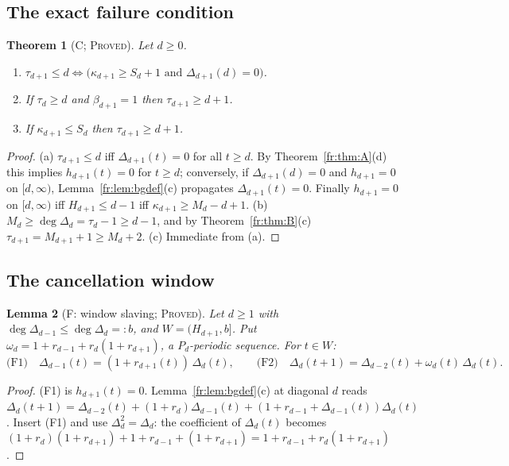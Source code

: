 \documentclass[11pt]{article}
\newtheorem{theorem}{Theorem}[section]
\newtheorem{lemma}[theorem]{Lemma}
\theoremstyle{definition}
\theoremstyle{remark}
\newcommand{\PROVED}{\textsc{Proved}}
\begin{document}
\subsection{The exact failure condition}

\begin{theorem}[C; \PROVED]\label{fr:thm:C}
Let $d\ge0$.
\begin{enumerate}
\item[(a)] $\tau_{d+1}\le d\iff\bigl(\kappa_{d+1}\ge S_d+1\text{ and }\Delta_{d+1}(d)=0\bigr)$.
\item[(b)] If $\tau_d\ge d$ and $\beta_{d+1}=1$ then $\tau_{d+1}\ge d+1$.
\item[(c)] If $\kappa_{d+1}\le S_d$ then $\tau_{d+1}\ge d+1$.
\end{enumerate}
\end{theorem}
\begin{proof}
(a) $\tau_{d+1}\le d$ iff $\Delta_{d+1}(t)=0$ for all $t\ge d$. By Theorem~\ref{fr:thm:A}(d) this implies
$h_{d+1}(t)=0$ for $t\ge d$; conversely, if $\Delta_{d+1}(d)=0$ and $h_{d+1}=0$ on $[d,\infty)$,
Lemma~\ref{fr:lem:bgdef}(c) propagates $\Delta_{d+1}(t)=0$. Finally $h_{d+1}=0$ on $[d,\infty)$ iff
$H_{d+1}\le d-1$ iff $\kappa_{d+1}\ge M_d-d+1$.
(b) $M_d\ge\deg\Delta_d=\tau_d-1\ge d-1$, and by Theorem~\ref{fr:thm:B}(c)
$\tau_{d+1}=M_{d+1}+1\ge M_d+2$.
(c) Immediate from (a).
\end{proof}

\subsection{The cancellation window}

\begin{lemma}[F: window slaving; \PROVED]\label{fr:lem:F}
Let $d\ge1$ with $\deg\Delta_{d-1}\le\deg\Delta_d=:b$, and $W=(H_{d+1},b]$. Put
$\omega_d=1+r_{d-1}+r_d(1+r_{d+1})$, a $P_d$-periodic sequence. For $t\in W$:
\[
\text{(F1)}\quad \Delta_{d-1}(t)=(1+r_{d+1}(t))\,\Delta_d(t),\qquad
\text{(F2)}\quad \Delta_d(t+1)=\Delta_{d-2}(t)+\omega_d(t)\,\Delta_d(t).
\]
\end{lemma}
\begin{proof}
(F1) is $h_{d+1}(t)=0$. Lemma~\ref{fr:lem:bgdef}(c) at diagonal $d$ reads
$\Delta_d(t+1)=\Delta_{d-2}(t)+(1+r_d)\Delta_{d-1}(t)+(1+r_{d-1}+\Delta_{d-1}(t))\Delta_d(t)$.
Insert (F1) and use $\Delta_d^2=\Delta_d$: the coefficient of $\Delta_d(t)$ becomes
$(1+r_d)(1+r_{d+1})+1+r_{d-1}+(1+r_{d+1})=1+r_{d-1}+r_d(1+r_{d+1})$.
\end{proof}
\end{document}
